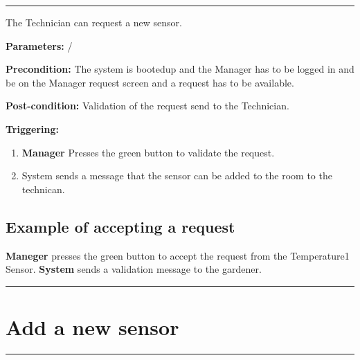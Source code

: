 \hrule
\hfill
\vspace{0.5cm}

\label{operation:Accept the request for a new sensor}

The Technician can request a new sensor.
\begin{description}
\item \textbf{Parameters:} /
\item \textbf{Precondition:} The system is bootedup and the Manager has to be
logged in and be on the Manager request screen and a request has to be
available.
\item \textbf{Post-condition:} Validation of the request send to the Technician.

\item \textbf{Triggering:}
\begin{enumerate}
\item \textbf{Manager} Presses the green button to validate the request.
\item System sends a message that the sensor can be added to the room to the
technican.
\end{enumerate}
\end{description}

\subsection{Example of accepting a request}
\textbf{Maneger} presses the green button to accept the request from the
Temperature1 Sensor. \textbf{System} sends a validation message to the gardener.
\hfill
\vspace{0.5cm}
\hrule

\break

\section{Add a new sensor}

\hrule
\hfill
\vspace{0.5cm}

\label{operation:Add a new sensor}


